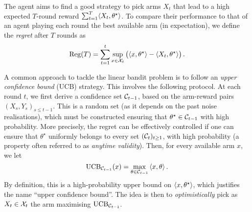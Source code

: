 The agent aims to find a good strategy to pick arms $X_t$ that lead to a high expected $T$-round reward 
$\sum_{t=1}^T\langle X_t,\theta^\star\rangle$. To compare their performance to that of an agent playing each round the best 
available arm (in expectation), we define the \emph{regret} after $T$ rounds as
\[\mathrm{Reg}(T) =\sum_{t=1}^t \sup_{x\in\mathcal{X}_t}\big( \langle x,\theta^\star\rangle - \langle X_t,\theta^\star\rangle\big)\,.\]

A common approach to tackle the linear bandit problem is to follow an \emph{upper confidence bound} (UCB) strategy. This 
involves the following protocol. At each round $t$, we first derive a confidence set $\mathcal{C}_{t-1}$, based on the 
arm-reward pairs $(X_s, Y_s)_{s\leq t-1}$. This is a random set (as it depends on the past noise realisations), which 
must be constructed ensuring that $\theta^\star\in \mathcal{C}_{t-1}$ with high probability. More precisely, the regret can be 
effectively controlled if one  can ensure that $\theta^\star$ uniformly belongs to every set $(\mathcal{C}_t)_{t\geq 1}$, with 
high probability (a property often referred to as \emph{anytime validity}). Then, for every available arm $x$, 
we let $$\mathrm{UCB}_{\mathcal{C}_{t-1}}(x) = \max_{\theta\in \mathcal{C}_{t-1}}\,\langle x,\theta\rangle\,.$$ By definition, this is a high-probability 
upper bound on $\langle x,\theta^\star\rangle$, which justifies the name ``upper confidence bound''. The idea is then to 
\emph{optimistically} pick as $X_t\in\mathcal{X}_t$ the arm maximising $\mathrm{UCB}_{\mathcal{C}_{t-1}}$. 




